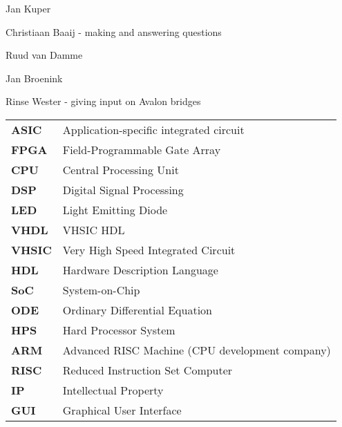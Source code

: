 
\begin{acknowledgements}      
\begin{itemizens}
	\item Jan Kuper	
	\item Christiaan Baaij - making \clash{} and answering questions
	\item Ruud van Damme
	\item Jan Broenink
	\item Rinse Wester - giving input on Avalon bridges
\end{itemizens}

\end{acknowledgements}


\vfill

\begin{acronyms}
\begin{tabular}{>{\bfseries}l l}
	ASIC & Application-specific integrated circuit \\
	FPGA & Field-Programmable Gate Array \\
	CPU & Central Processing Unit \\
	DSP & Digital Signal Processing \\
	LED & Light Emitting Diode \\
	VHDL & VHSIC HDL \\
	VHSIC & Very High Speed Integrated Circuit \\
	HDL & Hardware Description Language \\
	SoC & System-on-Chip \\ 
	ODE & Ordinary Differential Equation \\
	HPS & Hard Processor System \\
	ARM & Advanced RISC Machine (CPU development company) \\
	RISC & Reduced Instruction Set Computer \\
	IP & Intellectual Property \\
	GUI & Graphical User Interface \\
\end{tabular}		
\end{acronyms}    

  
